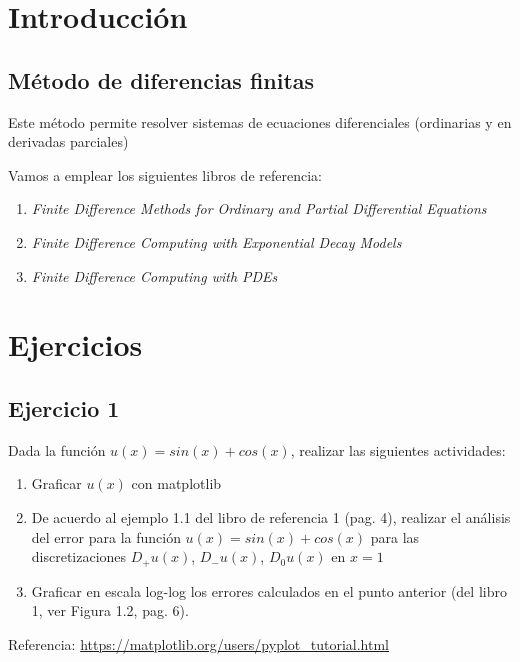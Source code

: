\documentclass[a4paper]{article}
\begin{document}

\section{Introducción}

\subsection{Método de diferencias finitas}

Este método permite resolver sistemas de ecuaciones diferenciales 
(ordinarias y en derivadas parciales)

\bigskip

Vamos a emplear los siguientes libros de referencia:

\begin{enumerate}
	\item \emph{Finite Difference Methods for Ordinary and Partial 
	Differential Equations}
	\item \emph{Finite Difference Computing with Exponential Decay 
	Models}
	\item \emph{Finite Difference Computing with PDEs}
\end{enumerate}


\section{Ejercicios}

\subsection{Ejercicio 1}

Dada la función $u(x) = sin(x) + cos(x)$, realizar las siguientes 
actividades:

\begin{enumerate}
	\item Graficar $u(x)$ con matplotlib
	\item De acuerdo al ejemplo 1.1 del libro de referencia 1 (pag. 4), 
	realizar el análisis del error para la función $u(x) = sin(x) + 
	cos(x)$ para las discretizaciones $D_+u(x)$, $D_-u(x)$, $D_0u(x)$ en 
	$x = 1$
	\item Graficar en escala log-log los errores calculados en el punto 
	anterior (del libro 1, ver Figura 1.2, pag. 6).
\end{enumerate}

Referencia: \url{https://matplotlib.org/users/pyplot_tutorial.html}
\end{document}
